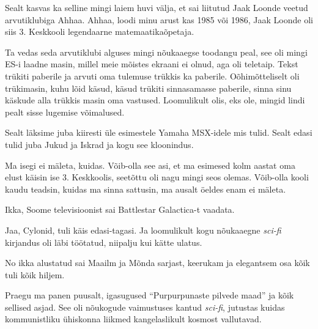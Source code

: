 Sealt kasvas ka selline mingi laiem huvi välja, et sai liitutud  Jaak Loonde veetud arvutiklubiga Ahhaa. Ahhaa, loodi minu arust kas 1985 või 1986, Jaak Loonde oli siis 3. Keskkooli legendaarne matemaatikaõpetaja. 

Ta vedas seda arvutiklubi alguses mingi nõukaaegse toodangu peal, see oli mingi ES-i laadne masin, millel meie mõistes ekraani ei olnud, aga oli teletaip. Tekst trükiti paberile ja arvuti oma tulemuse trükkis ka paberile. Oõhimõtteliselt oli trükimasin, kuhu lõid käsud, käsud trükiti sinnasamasse paberile, sinna sinu käskude alla trükkis masin oma vastused. Loomulikult olis, eks ole, mingid lindi pealt sisse lugemise võimalused.

Sealt läksime juba kiiresti üle esimestele Yamaha MSX-idele mis tulid. Sealt edasi tulid juba Jukud ja Iskrad ja kogu see kloonindus.


Ma isegi ei mäleta, kuidas. Võib-olla see asi, et ma esimesed kolm aastat oma elust käisin ise 3. Keskkoolis, seetõttu oli nagu mingi seos olemas. Võib-olla kooli kaudu teadsin, kuidas ma sinna sattusin, ma ausalt öeldes enam ei mäleta. 
                 

Ikka, Soome televisioonist sai Battlestar Galactica-t vaadata.


Jaa, Cylonid, tuli käis edasi-tagasi. Ja loomulikult kogu nõukaaegne \emph{sci-fi} kirjandus oli läbi töötatud, niipalju kui kätte ulatus.
      

No ikka alustatud sai Maailm ja Mõnda sarjast, keerukam ja elegantsem osa kõik tuli kõik hiljem. 

Praegu ma panen puusalt, igasugused \enquote{Purpurpunaste pilvede maad} ja kõik sellised asjad. See oli nõukogude vaimustuses kantud \emph{sci-fi}, jutustas kuidas kommunistliku ühiskonna liikmed kangelaslikult kosmost vallutavad.

